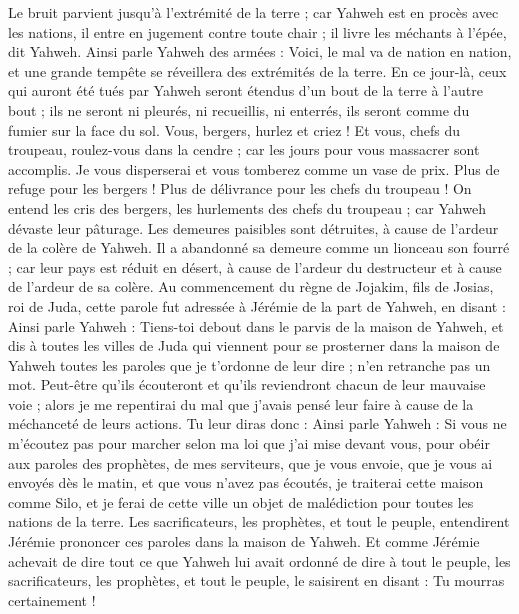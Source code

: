 \begin{multicols}{2}
Le bruit parvient jusqu’à l’extrémité de la terre ; car Yahweh est en procès avec les nations, il entre en jugement contre toute chair ; il livre les méchants à l'épée, dit Yahweh.
Ainsi parle Yahweh des armées : Voici, le mal va de nation en nation, et une grande tempête se réveillera des extrémités de la terre.
En ce jour-là, ceux qui auront été tués par Yahweh seront étendus d’un bout de la terre à l’autre bout ; ils ne seront ni pleurés, ni recueillis, ni enterrés, ils seront comme du fumier sur la face du sol.
Vous, bergers, hurlez et criez ! Et vous, chefs du troupeau, roulez-vous dans la cendre ; car les jours pour vous massacrer sont accomplis. Je vous disperserai et vous tomberez comme un vase de prix.
Plus de refuge pour les bergers ! Plus de délivrance pour les chefs du troupeau !
On entend les cris des bergers, les hurlements des chefs du troupeau ; car Yahweh dévaste leur pâturage.
Les demeures paisibles sont détruites, à cause de l'ardeur de la colère de Yahweh.
Il a abandonné sa demeure comme un lionceau son fourré ; car leur pays est réduit en désert, à cause de l'ardeur du destructeur et à cause de l'ardeur de sa colère.
\VerseOne{}Au commencement du règne de Jojakim, fils de Josias, roi de Juda, cette parole fut adressée à Jérémie de la part de Yahweh, en disant :
Ainsi parle Yahweh : Tiens-toi debout dans le parvis de la maison de Yahweh, et dis à toutes les villes de Juda qui viennent pour se prosterner dans la maison de Yahweh toutes les paroles que je t'ordonne de leur dire ; n'en retranche pas un mot.
Peut-être qu'ils écouteront et qu'ils reviendront chacun de leur mauvaise voie ; alors je me repentirai du mal que j’avais pensé leur faire à cause de la méchanceté de leurs actions.
Tu leur diras donc : Ainsi parle Yahweh : Si vous ne m'écoutez pas pour marcher selon ma loi que j’ai mise devant vous,
pour obéir aux paroles des prophètes, de mes serviteurs, que je vous envoie, que je vous ai envoyés dès le matin, et que vous n'avez pas écoutés,
je traiterai cette maison comme Silo, et je ferai de cette ville un objet de malédiction pour toutes les nations de la terre.
Les sacrificateurs, les prophètes, et tout le peuple, entendirent Jérémie prononcer ces paroles dans la maison de Yahweh.
Et comme Jérémie achevait de dire tout ce que Yahweh lui avait ordonné de dire à tout le peuple, les sacrificateurs, les prophètes, et tout le peuple, le saisirent en disant : Tu mourras certainement !

\end{multicols}
